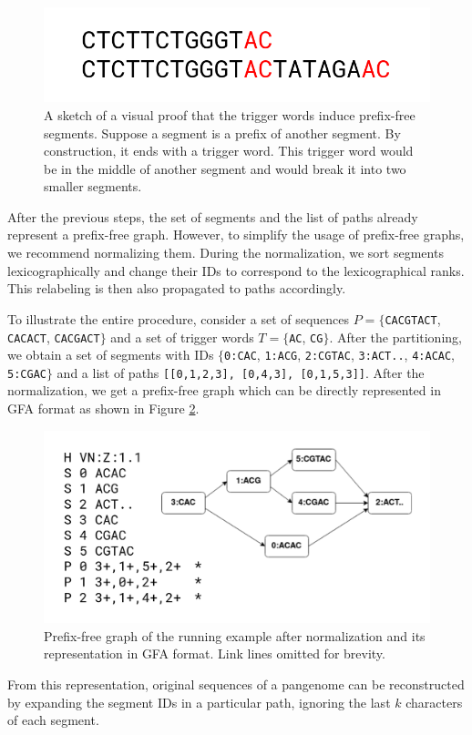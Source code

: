 \begin{figure}
    \centering
    \includegraphics[width=0.6\linewidth]{images/prefixfree_proof.png}
    \caption{
        A sketch of a visual proof that the trigger words induce prefix-free segments.
        Suppose a segment is a prefix of another segment.
        By construction, it ends with a trigger word.
        This trigger word would be in the middle of another segment and would break it into two smaller segments.
    }
    \label{fig:proof}
\end{figure}

After the previous steps, the set of segments and the list of paths already represent a prefix-free graph.
However, to simplify the usage of prefix-free graphs, we recommend normalizing them.
During the normalization, we sort segments lexicographically and change their IDs to correspond to the lexicographical ranks.
This relabeling is then also propagated to paths accordingly. 

To illustrate the entire procedure, consider a set of sequences $P = \{$\texttt{CACGTACT}, \texttt{CACACT}, \texttt{CACGACT}$\}$ and a set of trigger words $T = \{$\texttt{AC}, \texttt{CG}$\}$.
After the partitioning, we obtain a set of segments with IDs $\{$\texttt{0:CAC}, \texttt{1:ACG}, \texttt{2:CGTAC}, \texttt{3:ACT..}, \texttt{4:ACAC}, \texttt{5:CGAC}$\}$ and a list of paths \texttt{[[0,1,2,3], [0,4,3], [0,1,5,3]]}.
After the normalization, we get a prefix-free graph which can be directly represented in GFA format as shown in Figure \ref{fig:gfa}.

\begin{figure}
    \centering
    \includegraphics[width=\linewidth]{images/pfg_gfa.v3.png}
    \caption{
        Prefix-free graph of the running example after normalization and its representation in GFA format.
        Link lines omitted for brevity.
    }
    \label{fig:gfa}
\end{figure}

From this representation, original sequences of a pangenome can be reconstructed by expanding the segment IDs in a particular path, ignoring the last $k$ characters of each segment.

